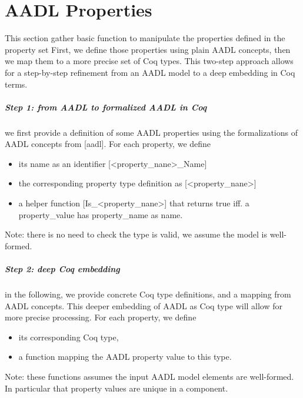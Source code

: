 \chapter{AADL Properties}
\label{chap::aadl_properties}

This section gather basic function to manipulate the properties  defined in the property set First, we define those properties using plain AADL concepts, then we map them to a more precise set of Coq types. This two-step approach allows for a step-by-step refinement from an AADL model to a deep embedding in Coq terms.

\paragraph{Step 1: from AADL to formalized AADL in Coq} we first provide a definition of some AADL properties using the formalizations of AADL concepts from [aadl]. For each property, we define
\begin{itemize}
\item its name as an identifier [<property\_nane>\_Name]
\item the corresponding property type definition as [<property\_nane>]
\item a helper function [Is\_<property\_nane>] that returns true iff. a property\_value has property\_name as name.
\end{itemize}

Note: there is no need to check the type is valid, we assume the model is well-formed.

\paragraph{Step 2: deep Coq embedding} in the following, we provide concrete Coq type definitions, and a mapping from AADL concepts. This deeper embedding of AADL as Coq type will allow for more precise processing. For each property, we define

\begin{itemize}
\item its corresponding Coq type,
\item a function mapping the AADL property value to this type.
\end{itemize}

Note: these functions assumes the input AADL model elements are well-formed. In particular that property values are unique in a component.



